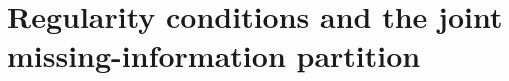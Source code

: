 %
%
\section{Regularity conditions and the joint missing-information partition}
\label{supp:partition}

